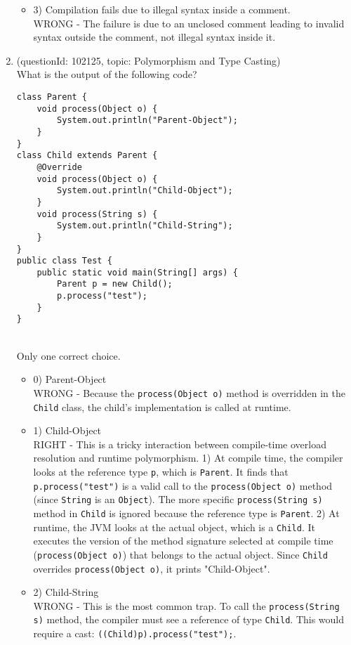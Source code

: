 \documentclass[12pt]{article}
\begin{document}
\begin{enumerate}[label=(\arabic*)]
\begin{itemize}
\item 3) Compilation fails due to illegal syntax inside a comment.
 \\ 
WRONG - The failure is due to an unclosed comment leading to invalid syntax outside the comment, not illegal syntax inside it.

\end{itemize}
\item (questionId: 102125, topic: Polymorphism and Type Casting) \\ 
What is the output of the following code?\n\begin{verbatim}
class Parent {
    void process(Object o) {
        System.out.println("Parent-Object");
    }
}
class Child extends Parent {
    @Override
    void process(Object o) {
        System.out.println("Child-Object");
    }
    void process(String s) {
        System.out.println("Child-String");
    }
}
public class Test {
    public static void main(String[] args) {
        Parent p = new Child();
        p.process("test");
    }
}
\end{verbatim}
\\ \noindent Only one correct choice. 
\begin{itemize}
\item 0) Parent-Object
 \\ 
WRONG - Because the \verb|process(Object o)| method is overridden in the \verb|Child| class, the child's implementation is called at runtime.

\item 1) Child-Object
 \\ 
RIGHT - This is a tricky interaction between compile-time overload resolution and runtime polymorphism. 1) At compile time, the compiler looks at the reference type \verb|p|, which is \verb|Parent|. It finds that \verb|p.process("test")| is a valid call to the \verb|process(Object o)| method (since \verb|String| is an \verb|Object|). The more specific \verb|process(String s)| method in \verb|Child| is ignored because the reference type is \verb|Parent|. 2) At runtime, the JVM looks at the actual object, which is a \verb|Child|. It executes the version of the method signature selected at compile time (\verb|process(Object o)|) that belongs to the actual object. Since \verb|Child| overrides \verb|process(Object o)|, it prints "Child-Object".

\item 2) Child-String
 \\ 
WRONG - This is the most common trap. To call the \verb|process(String s)| method, the compiler must see a reference of type \verb|Child|. This would require a cast: \verb|((Child)p).process("test");|.


\end{itemize}
\end{enumerate}
\end{document}
